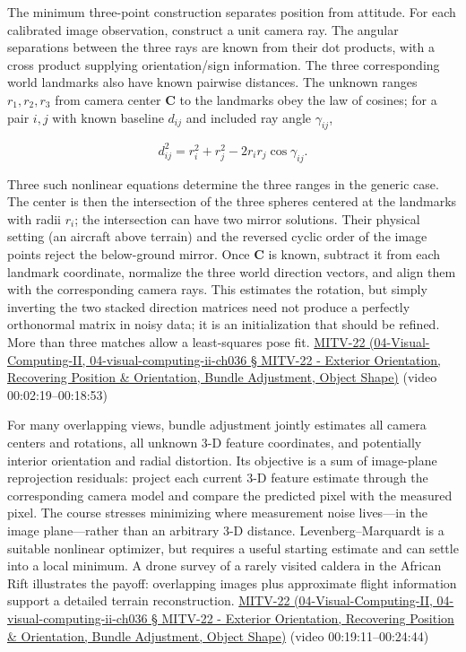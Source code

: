 The minimum three-point construction separates position from attitude. For each calibrated image observation, construct a unit camera ray. The angular separations between the three rays are known from their dot products, with a cross product supplying orientation/sign information. The three corresponding world landmarks also have known pairwise distances. The unknown ranges \(r_1,r_2,r_3\) from camera center \(\mathbf C\) to the landmarks obey the law of cosines; for a pair \(i,j\) with known baseline \(d_{ij}\) and included ray angle \(\gamma_{ij}\),

\[
d_{ij}^2=r_i^2+r_j^2-2r_ir_j\cos\gamma_{ij}.
\]

Three such nonlinear equations determine the three ranges in the generic case. The center is then the intersection of the three spheres centered at the landmarks with radii \(r_i\); the intersection can have two mirror solutions. Their physical setting (an aircraft above terrain) and the reversed cyclic order of the image points reject the below-ground mirror. Once \(\mathbf C\) is known, subtract it from each landmark coordinate, normalize the three world direction vectors, and align them with the corresponding camera rays. This estimates the rotation, but simply inverting the two stacked direction matrices need not produce a perfectly orthonormal matrix in noisy data; it is an initialization that should be refined. More than three matches allow a least-squares pose fit. \href{}{MITV-22 (04-Visual-Computing-II, 04-visual-computing-ii-ch036 § MITV-22 - Exterior Orientation, Recovering Position \& Orientation, Bundle Adjustment, Object Shape)} (video 00:02:19--00:18:53)

For many overlapping views, bundle adjustment jointly estimates all camera centers and rotations, all unknown 3-D feature coordinates, and potentially interior orientation and radial distortion. Its objective is a sum of image-plane reprojection residuals: project each current 3-D feature estimate through the corresponding camera model and compare the predicted pixel with the measured pixel. The course stresses minimizing where measurement noise lives---in the image plane---rather than an arbitrary 3-D distance. Levenberg--Marquardt is a suitable nonlinear optimizer, but requires a useful starting estimate and can settle into a local minimum. A drone survey of a rarely visited caldera in the African Rift illustrates the payoff: overlapping images plus approximate flight information support a detailed terrain reconstruction. \href{}{MITV-22 (04-Visual-Computing-II, 04-visual-computing-ii-ch036 § MITV-22 - Exterior Orientation, Recovering Position \& Orientation, Bundle Adjustment, Object Shape)} (video 00:19:11--00:24:44)

